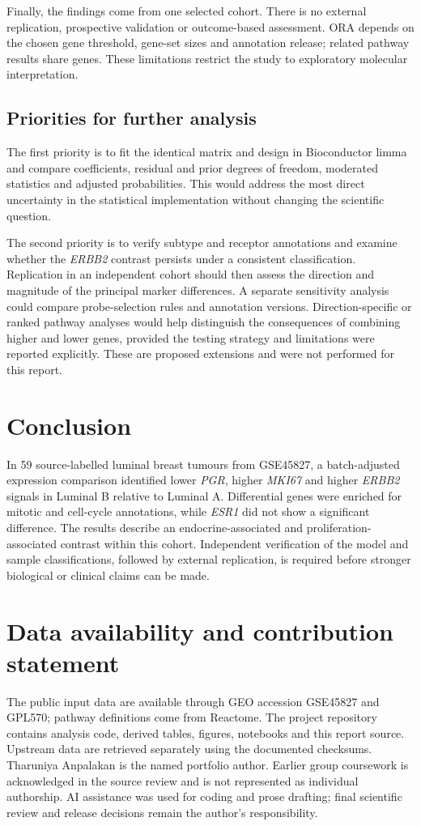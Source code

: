 \documentclass[11pt,a4paper]{article}
\newcommand{\gene}[1]{\textit{#1}}
\begin{document}
Finally, the findings come from one selected cohort. There is no external replication, prospective validation or outcome-based assessment. ORA depends on the chosen gene threshold, gene-set sizes and annotation release; related pathway results share genes. These limitations restrict the study to exploratory molecular interpretation.

\subsection{Priorities for further analysis}
The first priority is to fit the identical matrix and design in Bioconductor limma and compare coefficients, residual and prior degrees of freedom, moderated statistics and adjusted probabilities. This would address the most direct uncertainty in the statistical implementation without changing the scientific question.

The second priority is to verify subtype and receptor annotations and examine whether the \gene{ERBB2} contrast persists under a consistent classification. Replication in an independent cohort should then assess the direction and magnitude of the principal marker differences. A separate sensitivity analysis could compare probe-selection rules and annotation versions. Direction-specific or ranked pathway analyses would help distinguish the consequences of combining higher and lower genes, provided the testing strategy and limitations were reported explicitly. These are proposed extensions and were not performed for this report.

\section{Conclusion}
In 59 source-labelled luminal breast tumours from GSE45827, a batch-adjusted expression comparison identified lower \gene{PGR}, higher \gene{MKI67} and higher \gene{ERBB2} signals in Luminal B relative to Luminal A. Differential genes were enriched for mitotic and cell-cycle annotations, while \gene{ESR1} did not show a significant difference. The results describe an endocrine-associated and proliferation-associated contrast within this cohort. Independent verification of the model and sample classifications, followed by external replication, is required before stronger biological or clinical claims can be made.

\section*{Data availability and contribution statement}
The public input data are available through GEO accession GSE45827 and GPL570; pathway definitions come from Reactome. The project repository contains analysis code, derived tables, figures, notebooks and this report source. Upstream data are retrieved separately using the documented checksums. Tharuniya Anpalakan is the named portfolio author. Earlier group coursework is acknowledged in the source review and is not represented as individual authorship. AI assistance was used for coding and prose drafting; final scientific review and release decisions remain the author's responsibility.
\end{document}
